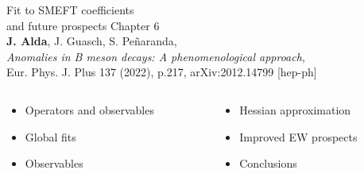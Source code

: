 \documentclass[mathserif, 10pt, dvipsnames]{beamer}
\begin{document}
\begin{frame}[plain] %
\begin{block}{\huge Fit to SMEFT coefficients\\ and future prospects}
    Chapter 6\\
    {\color{red} \textbf{J. Alda}, J. Guasch, S. Peñaranda,\\
    \textit{Anomalies in B meson decays: A phenomenological approach,}\\
    Eur. Phys. J. Plus 137 (2022), p.217, arXiv:2012.14799 [hep-ph]}
\end{block}

\vspace{1.3cm}

\begin{columns}
\begin{column}{0.48\textwidth}
\begin{itemize}
\item Operators and observables
\item Global fits
\item Observables

\end{itemize}
\end{column}
\begin{column}{0.48\textwidth}
\begin{itemize}
\item Hessian approximation
\item Improved EW prospects
\item Conclusions
\end{itemize}
\end{column}
\end{columns}

\end{frame}
\end{document}
